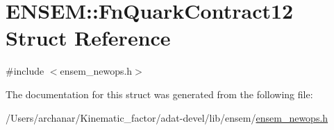 \hypertarget{structENSEM_1_1FnQuarkContract12}{}\section{E\+N\+S\+EM\+:\+:Fn\+Quark\+Contract12 Struct Reference}
\label{structENSEM_1_1FnQuarkContract12}


{\ttfamily \#include $<$ensem\+\_\+newops.\+h$>$}



The documentation for this struct was generated from the following file\+:\begin{DoxyCompactItemize}
\item 
/\+Users/archanar/\+Kinematic\+\_\+factor/adat-\/devel/lib/ensem/\mbox{\hyperlink{adat-devel_2lib_2ensem_2ensem__newops_8h}{ensem\+\_\+newops.\+h}}\end{DoxyCompactItemize}

